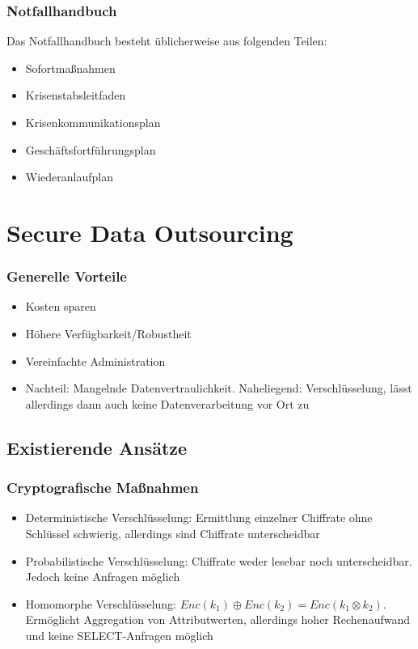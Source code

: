 \subsubsection{Notfallhandbuch}
Das Notfallhandbuch besteht üblicherweise aus folgenden Teilen:
\begin{itemize}
	\item Sofortmaßnahmen
	\item Krisenstabsleitfaden
	\item Krisenkommunikationsplan
	\item Geschäftsfortführungsplan
	\item Wiederanlaufplan
\end{itemize}



\section{Secure Data Outsourcing}

\subsubsection{Generelle Vorteile}
\begin{itemize}
	\item Kosten sparen
	\item Höhere Verfügbarkeit/Robustheit
	\item Vereinfachte Administration
	\item Nachteil: Mangelnde Datenvertraulichkeit. Naheliegend: Verschlüsselung, lässt allerdings dann auch keine Datenverarbeitung vor Ort zu
\end{itemize}


\subsection{Existierende Ansätze}

\subsubsection{Cryptografische Maßnahmen}
\begin{itemize}
	\item Deterministische Verschlüsselung: Ermittlung einzelner Chiffrate ohne Schlüssel schwierig, allerdings sind Chiffrate unterscheidbar
	\item Probabilistische Verschlüsselung: Chiffrate weder lesebar noch unterscheidbar. Jedoch keine Anfragen möglich
	\item Homomorphe Verschlüsselung: $Enc(k_1) \oplus Enc(k_2) = Enc(k_1 \otimes k_2)$. Ermöglicht Aggregation von Attributwerten, allerdings hoher Rechenaufwand und keine SELECT-Anfragen möglich
\end{itemize}


